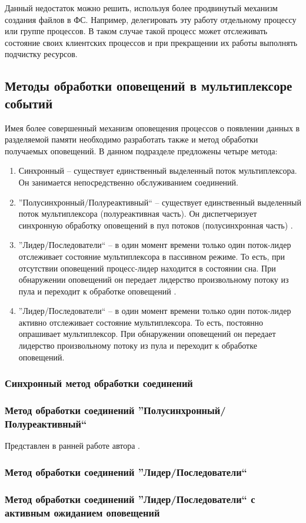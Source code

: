 Данный недостаток можно решить, используя более продвинутый механизм создания файлов в ФС. Например, делегировать эту работу отдельному процессу или группе процессов. В таком случае такой процесс может отслеживать состояние своих клиентских процессов и при прекращении их работы выполнять подчистку ресурсов.

\subsection{Методы обработки оповещений в мультиплексоре событий}

Имея более совершенный механизм оповещения процессов о появлении данных в разделяемой памяти необходимо разработать также и метод обработки получаемых оповещений. В данном подразделе предложены четыре метода:
\begin{enumerate}
\item Синхронный -- существует единственный выделенный поток мультиплексора. Он занимается непосредственно обслуживанием соединений.
\item ''Полусинхронный/Полуреактивный`` -- существует единственный выделенный поток мультиплексора (полуреактивная часть). Он диспетчеризует синхронную обработку оповещений в пул потоков (полусинхронная часть) \cite{schmidt1995half}.
\item ''Лидер/Последователи`` -- в один момент времени только один поток-лидер отслеживает состояние мультиплексора в пассивном режиме. То есть, при отсутствии оповещений процесс-лидер находится в состоянии сна. При обнаружении оповещений он передает лидерство произвольному потоку из пула и переходит к обработке оповещений \cite{schmidt1998leader}.
\item ''Лидер/Последователи`` -- в один момент времени только один поток-лидер активно отслеживает состояние мультиплексора. То есть, постоянно опрашивает мультиплексор. При обнаружении оповещений он передает лидерство произвольному потоку из пула и переходит к обработке оповещений.
\end{enumerate}

\subsubsection{Синхронный метод обработки соединений}

\subsubsection{Метод обработки соединений ''Полусинхронный/Полуреактивный``}\label{chapter31:BlockingHSHA}
Представлен в ранней работе автора \cite{GubarevFutex}.

\subsubsection{Метод обработки соединений ''Лидер/Последователи``}\label{chapter31:BlockingLF}

\subsubsection{Метод обработки соединений ''Лидер/Последователи`` с активным ожиданием оповещений}\label{chapter31:NonBlockingLF}

\chapterconclusion

